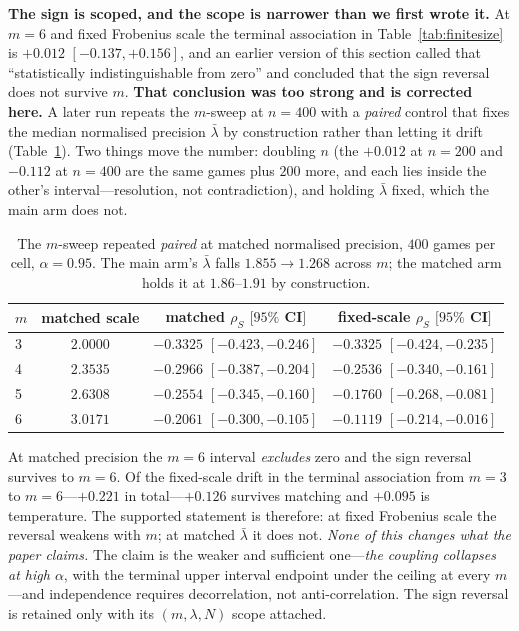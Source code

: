 \noindent\textbf{The sign is scoped, and the scope is narrower than we first wrote it.}
At $m=6$ and fixed Frobenius scale the terminal association in
Table~\ref{tab:finitesize} is $+0.012$ $[-0.137,+0.156]$, and an earlier version of this
section called that ``statistically indistinguishable from zero'' and concluded that the
sign reversal does not survive $m$. \textbf{That conclusion was too strong and is corrected
here.} A later run repeats the $m$-sweep at $n=400$ with a \emph{paired} control that fixes
the median normalised precision $\bar\lambda$ by construction rather than letting it drift
(Table~\ref{tab:c1b}). Two things move the number: doubling $n$ (the $+0.012$ at $n=200$
and $-0.112$ at $n=400$ are the same games plus $200$ more, and each lies inside the
other's interval---resolution, not contradiction), and holding $\bar\lambda$ fixed, which
the main arm does not.

\begin{table}[H]
\caption{The $m$-sweep repeated \emph{paired} at matched normalised precision, $400$ games
per cell, $\alpha=0.95$. The main arm's $\bar\lambda$ falls $1.855\to1.268$ across $m$; the
matched arm holds it at $1.86$--$1.91$ by construction.}
\label{tab:c1b}
\small
\begin{tabular}{lccc}
\toprule
$m$ & matched scale & matched $\rho_S$ $[95\%$ CI$]$ & fixed-scale $\rho_S$ $[95\%$ CI$]$ \\
\midrule
3 & $2.0000$ & $-0.3325$ $[-0.423,-0.246]$ & $-0.3325$ $[-0.424,-0.235]$ \\
4 & $2.3535$ & $-0.2966$ $[-0.387,-0.204]$ & $-0.2536$ $[-0.340,-0.161]$ \\
5 & $2.6308$ & $-0.2554$ $[-0.345,-0.160]$ & $-0.1760$ $[-0.268,-0.081]$ \\
6 & $3.0171$ & $\mathbf{-0.2061}$ $[-0.300,-0.105]$ & $-0.1119$ $[-0.214,-0.016]$ \\
\bottomrule
\end{tabular}
\end{table}

\noindent At matched precision the $m=6$ interval \emph{excludes} zero and the sign
reversal survives to $m=6$. Of the fixed-scale drift in the terminal association from $m=3$
to $m=6$---$+0.221$ in total---$+0.126$ survives matching and $+0.095$ is temperature. The
supported statement is therefore: at fixed Frobenius scale the reversal weakens with $m$;
at matched $\bar\lambda$ it does not. \emph{None of this changes what the paper claims.}
The claim is the weaker and sufficient one---\emph{the coupling collapses at high
$\alpha$}, with the terminal upper interval endpoint under the ceiling at every $m$---and
independence requires decorrelation, not anti-correlation. The sign reversal is retained
only with its $(m,\lambda,N)$ scope attached.

